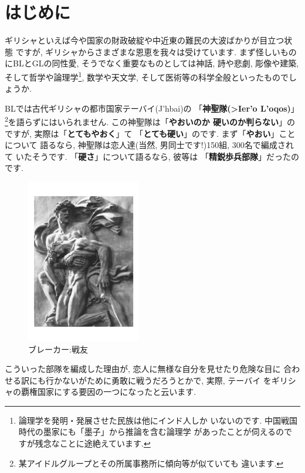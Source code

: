 \section{はじめに}

ギリシャといえば今や国家の財政破綻や中近東の難民の大波ばかりが目立つ状態
ですが, ギリシャからさまざまな恩恵を我々は受けています. まず怪しいもの
にBLとGLの同性愛, そうでなく重要なものとしては神話, 詩や悲劇, 彫像や建築,
 そして哲学や論理学\footnote{論理学を発明・発展させた民族は他にインド人しか
いないのです. 中国戦国時代の墨家にも「墨子」\cite{墨子}から推論を含む論理学
があったことが伺えるのですが残念なことに途絶えています.}, 数学や天文学,
 そして医術等の科学全般といったものでしょうか.
\newline

BLでは古代ギリシャの都市国家テーバイ(\textgreek{J'hbai})の
「\textbf{神聖隊(\textgreek{>Ier'o L'oqos})}」
\footnote{某アイドルグループとその所属事務所に傾向等が似ていても
違います.}を語らずにはいられません. この神聖隊は「\textbf{やおいのか
硬いのか判らない}」のですが, 実際は「\textbf{とてもやおく}」て
「\textbf{とても硬い}」のです. まず「\textbf{やおい}」ことについて
語るなら, 神聖隊は恋人達(当然, 男同士です!)150組, 300名で編成されて
いたそうです. 「\textbf{硬さ}」について語るなら, 彼等は
「\textbf{精鋭歩兵部隊}」だったのです.
\newline
 
 
\begin{figure}
\includegraphics[width=5cm]{arno_breker_kameradschaft.pdf}
\caption{ブレーカー:戦友}
\label{fig:breker2}
\end{figure}

こういった部隊を編成した理由が, 恋人に無様な自分を見せたり危険な目に
合わせる訳にも行かないがために勇敢に戦うだろうとかで, 実際, テーバイ
をギリシャの覇権国家にする要因の一つになったと云います.
\newline

